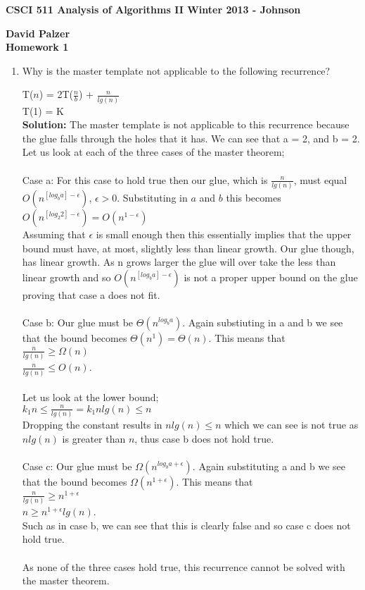 \documentclass[11pt]{article}
\begin{document}
\textbf{CSCI 511 Analysis of Algorithms II \hfill Winter 2013 - Johnson}

\begin{center}
\textbf{David Palzer \\ Homework 1}
\end{center}

\begin{enumerate}


\item Why is the master template not applicable to the following recurrence?

T($n$) = 2T($\frac{n}{b}$) + $\frac{n}{lg(n)}$\\
T(1) = K\\

\textbf{Solution:} The master template is not applicable to this recurrence because the glue falls through the holes that it has. We can see that a = 2, and b = 2. Let us look at each of the three cases of the master theorem;\\\\Case a: For this case to hold true then our glue, which is $\frac{n}{lg(n)}$, must equal $O(n^{[log_{b}a]-\epsilon})$, $\epsilon > 0$. Substituting in $a$ and $b$ this becomes\\ $O(n^{[log_{2}2]-\epsilon}) = O(n^{1-\epsilon})$\\ Assuming that $\epsilon$ is small enough then this essentially implies that the upper bound must have, at most, slightly less than linear growth. Our glue though, has linear growth. As n grows larger the glue will over take the less than linear growth and so $O(n^{[log_{b}a]-\epsilon})$ is not a proper upper bound on the glue proving that case a does not fit.\\\\Case b: Our glue must be $\Theta(n^{log_{b}a})$. Again substiuting in a and b we see that the bound becomes $\Theta(n^{1}) = \Theta(n)$. This means that\\$\frac{n}{lg(n)} \geq \Omega(n)$\\$\frac{n}{lg(n)} \leq O(n)$.\\\\Let us look at the lower bound;\\$k_{1}n \leq \frac{n}{lg(n)} = k_{1}nlg(n) \leq n$\\Dropping the constant results in $nlg(n) \leq n$ which we can see is not true as $nlg(n)$ is greater than $n$, thus case b does not hold true.\\\\Case c: Our glue must be $\Omega(n^{log_{b}a+\epsilon})$. Again substituting a and b we see that the bound becomes $\Omega(n^{1+\epsilon})$. This means that\\$\frac{n}{lg(n)} \geq n^{1+\epsilon}$\\$n \geq n^{1+\epsilon}lg(n)$. \\Such as in case b, we can see that this is clearly false and so case c does not hold true.\\\\As none of the three cases hold true, this recurrence cannot be solved with the master theorem.


\end{enumerate}
\end{document}
